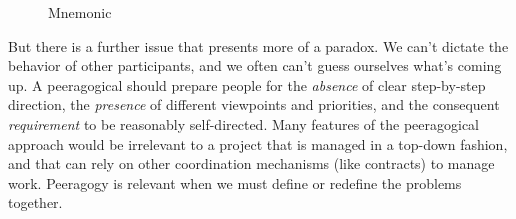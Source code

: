 \begin{wrapfigure}{l}{.52\textwidth}
\vspace{-2.8cm}
\hspace{-.15cm}\resizebox{.55\textwidth}{!}{

}
\hspace{.4cm}
\vspace{-2.95cm}
\caption{Mnemonic \label{mnemonic}}
\vspace{-.6cm}
\end{wrapfigure}

But there is a further issue that presents more of a paradox.  We
can't dictate the behavior of other participants, and we often can't
guess ourselves what's coming up.  A peeragogical
 should prepare people for the \emph{absence} of
clear step-by-step direction, the \emph{presence} of different
viewpoints and priorities, and the consequent \emph{requirement} to be
reasonably self-directed.  Many features of the peeragogical approach
would be irrelevant to a project that is managed in a top-down
fashion, and that can rely on other coordination mechanisms (like
contracts) to manage work.  Peeragogy is relevant when we must define
or redefine the problems together.


